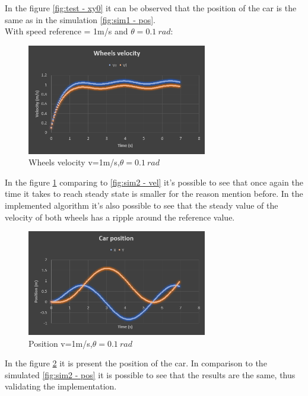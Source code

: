 In the figure \ref{fig:test - xy0} it can be observed that the position of the car is the same as in the simulation \ref{fig:sim1 - pos}.\\
With speed reference = 1m/s and $\theta = 0.1~\si{rad}$:
\newpage
\begin{figure}[!h]
\centering
\includegraphics[width=0.7\textwidth]{./img/testv1t01.PNG}
\caption {\label{fig:test - vel01}Wheels velocity v=1m/s,$\theta = 0.1~\si{rad}$}
\end{figure}
In the figure \ref{fig:test - vel01} comparing to \ref{fig:sim2 - vel} it's possible to see that once again the time it takes to reach steady state is smaller for the reason mention before. In the implemented algorithm it's also possible to see that the steady value of the velocity of both wheels has a ripple around the reference value. \\


\begin{figure}[!hb]
\centering
\includegraphics[width=0.7\textwidth]{./img/testx1t01.PNG}
\caption {\label{fig:test - xy01}Position v=1m/s,$\theta = 0.1~\si{rad}$}
\end{figure}
In the figure \ref{fig:test - xy01} it is present the position of the car. In comparison to the simulated \ref{fig:sim2 - pos} it is possible to see that the results are the same, thus validating the implementation.\\
